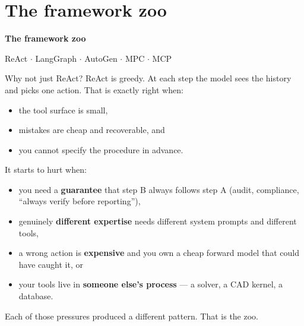 \documentclass[aspectratio=169,10pt]{beamer}
\newcommand{\hl}[1]{\textcolor{accent}{\textbf{#1}}}
\begin{document}
\section{The framework zoo}

\begin{frame}[plain]
\begin{center}
\Huge\bfseries The framework zoo
\vspace{1em}

\large\mdseries ReAct $\cdot$ LangGraph $\cdot$ AutoGen $\cdot$ MPC $\cdot$ MCP
\end{center}
\end{frame}

\begin{frame}{Why not just ReAct?}
ReAct is greedy. At each step the model sees the history and picks one action.
That is exactly right when:

\begin{itemize}\itemsep4pt
  \item the tool surface is small,
  \item mistakes are cheap and recoverable, and
  \item you cannot specify the procedure in advance.
\end{itemize}

\vspace{0.8em}
It starts to hurt when:

\begin{itemize}\itemsep4pt
  \item you need a \hl{guarantee} that step B always follows step A
        (audit, compliance, ``always verify before reporting''),
  \item genuinely \hl{different expertise} needs different system prompts and
        different tools,
  \item a wrong action is \hl{expensive} and you own a cheap forward model that
        could have caught it, or
  \item your tools live in \hl{someone else's process} --- a solver, a CAD kernel,
        a database.
\end{itemize}

\vspace{0.5em}
Each of those pressures produced a different pattern. That is the zoo.
\end{frame}
\end{document}
